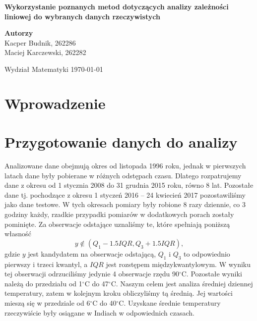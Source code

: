 \documentclass[12pt]{article}
\theoremstyle{exer}
\begin{document}
	\begin{titlepage}
		\begin{center}
			
			\textbf{\Huge  Wykorzystanie poznanych metod dotyczących analizy zależności liniowej
				do wybranych danych rzeczywistych}
			
			\vspace{0.5cm}
			
			\vspace{1.5cm}
			
			\textbf{\LARGE Autorzy}\\
			\vspace{0.5cm}
			\large Kacper Budnik, 262286\\
			\large Maciej Karczewski, 262282\\
			
			
			\vfill
			
			\vspace{0.4cm}
			

			
			\vspace{0.8cm}
			Wydział Matematyki	
			\today
		\end{center}
	\end{titlepage}
	\tableofcontents
	\newpage
	
	\section{Wprowadzenie}


	\section{Przygotowanie danych do analizy}
	Analizowane dane obejmują okres od listopada 1996 roku, jednak w pierwszych latach dane były pobierane w różnych odstępach czasu. Dlatego rozpatrujemy dane z okresu od 1 stycznia 2008 do 31 grudnia 2015 roku, równo 8 lat. Pozostałe dane tj. pochodzące z okresu 1 styczeń 2016 -- 24 kwiecień 2017 pozostawiliśmy jako dane testowe. W tych okresach pomiary były robione 8 razy dziennie, co 3 godziny każdy, rzadkie przypadki pomiarów w dodatkowych porach zostały pominięte. Za obserwacje odstające uznaliśmy te, które spełniają poniższą własność
	\begin{equation}
		y\notin\left(Q_1-1.5IQR,Q_3+1.5IQR\right),
	\end{equation}
	gdzie $y$ jest kandydatem na obserwacje odstającą, $Q_1$ i $Q_3$ to odpowiednio pierwszy i trzeci kwantyl, a $IQR$ jest rozstępem międzykwantylowym. W wyniku tej obserwacji odrzuciliśmy jedynie 4 obserwacje rzędu 90$^\circ$C. Pozostałe wyniki należą do przedziału od 1$^\circ$C do 47$^\circ$C. Naszym celem jest analiza średniej dziennej temperatury, zatem w kolejnym kroku obliczyliśmy tą średnią. Jej wartości mieszą się w przedziale od 6$^\circ$C do 40$^\circ$C. Uzyskane średnie temperatury rzeczywiście były osiągane w Indiach w odpowiednich czasach.
\end{document}
